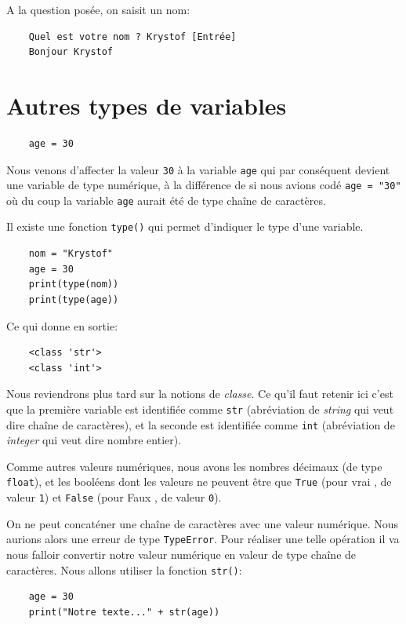 \documentclass[a4paper,11pt]{book}
\begin{document}
A la question posée, on saisit un nom:
\begin{verbatim}
    Quel est votre nom ? Krystof [Entrée]
    Bonjour Krystof
\end{verbatim}
\medskip

\section{Autres types de variables}
\begin{verbatim}
    age = 30
\end{verbatim}
\medskip

Nous venons d'affecter la valeur \texttt{30} à la variable \texttt{age} qui par conséquent devient une variable de type numérique, à la différence de si nous avions codé \verb|age = "30"| où du coup la variable \texttt{age} aurait été de type chaîne de caractères.
\medskip

Il existe une fonction \texttt{type()} qui permet d'indiquer le type d'une variable.
\begin{lstlisting}
    nom = "Krystof"
    age = 30
    print(type(nom))
    print(type(age))
\end{lstlisting}
\medskip

Ce qui donne en sortie:
\begin{verbatim}
    <class 'str'>
    <class 'int'>
\end{verbatim}
\medskip

Nous reviendrons plus tard sur la notions de \textit{classe}. Ce qu'il faut retenir ici c'est que la première variable est identifiée comme \texttt{str} (abréviation de \textit{string} qui veut dire \og chaîne de caractères\fg), et la seconde est identifiée comme \texttt{int} (abréviation de \textit{integer} qui veut dire \og nombre entier\fg).
\medskip

Comme autres valeurs numériques, nous avons les nombres décimaux (de type \texttt{float}), et les booléens dont les valeurs ne peuvent être que \texttt{True} (pour \og vrai \fg, de valeur \texttt{1}) et \texttt{False} (pour \og Faux \fg, de valeur \texttt{0}).
\medskip
  
On ne peut concaténer une chaîne de caractères avec une valeur numérique. Nous aurions alors une erreur de type \texttt{TypeError}. Pour réaliser une telle opération il va nous falloir convertir notre valeur numérique en valeur de type chaîne de caractères. Nous allons utiliser la fonction \texttt{str()}:
\begin{lstlisting}
    age = 30
    print("Notre texte..." + str(age))
\end{lstlisting}
\medskip
\end{document}
